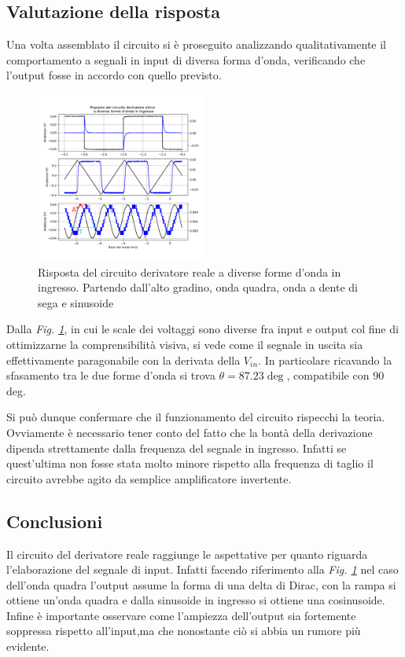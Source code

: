 \documentclass[journal]{IEEEtran}
\begin{document}
\subsection{\textbf{Valutazione della risposta}}
Una volta assemblato il circuito si è proseguito analizzando qualitativamente il comportamento a segnali in input di diversa forma d'onda, verificando che l'output fosse in accordo con quello previsto.

\begin{figure}[H]%
\begin{center}
\includegraphics[width=0.50\textwidth]{analysis/output/OPA-differentiator.pdf}
\caption{Risposta del circuito derivatore reale a diverse forme d’onda in ingresso. Partendo dall’alto gradino, onda quadra, onda a dente di sega e sinusoide}
\label{fig:derivatore}
\end{center}
\end{figure}
Dalla \textit{Fig. \ref{fig:derivatore}}, in cui le scale dei voltaggi sono diverse fra input e output col fine di ottimizzarne la comprensibilità visiva, si vede come il segnale in uscita sia effettivamente paragonabile con la derivata della $V_{in}$. In particolare ricavando la sfasamento tra le due forme d'onda si trova $\theta = 87.23 \deg$, compatibile con 90 deg.

Si può dunque confermare che il funzionamento del circuito rispecchi la teoria. Ovviamente è necessario tener conto del fatto che la bontà della derivazione dipenda strettamente dalla frequenza del segnale in ingresso. Infatti se quest'ultima non fosse stata molto minore rispetto alla frequenza di taglio il circuito avrebbe agito da semplice amplificatore invertente.
\subsection{\textbf{Conclusioni}}
Il circuito del derivatore reale raggiunge le aspettative per quanto riguarda l'elaborazione del segnale di input. Infatti facendo riferimento alla \textit{Fig. \ref{fig:derivatore}} nel caso dell'onda quadra l'output assume la forma di una delta di Dirac, con la rampa si ottiene un'onda quadra e dalla sinusoide in ingresso si ottiene una cosinusoide. Infine è importante osservare come l'ampiezza dell'output sia fortemente soppressa rispetto all'input,ma che nonostante ciò si abbia un rumore più evidente.
\end{document}
